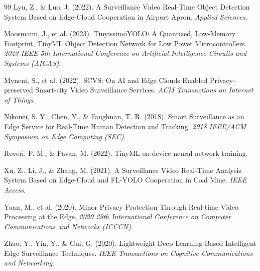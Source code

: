 \documentclass[12pt, a4paper]{article}
\begin{document}
\begin{thebibliography}{99}
 Lyu, Z., \& Luo, J. (2022). A Surveillance Video Real-Time Object Detection System Based on Edge-Cloud Cooperation in Airport Apron. \textit{Applied Sciences}. %

 Moosmann, J., et al. (2023). TinyissimoYOLO: A Quantized, Low-Memory Footprint, TinyML Object Detection Network for Low Power Microcontrollers. \textit{2023 IEEE 5th International Conference on Artificial Intelligence Circuits and Systems (AICAS)}. %

 Myneni, S., et al. (2022). SCVS: On AI and Edge Clouds Enabled Privacy-preserved Smart-city Video Surveillance Services. \textit{ACM Transactions on Internet of Things}. %

 Nikouei, S. Y., Chen, Y., \& Faughnan, T. R. (2018). Smart Surveillance as an Edge Service for Real-Time Human Detection and Tracking. \textit{2018 IEEE/ACM Symposium on Edge Computing (SEC)}. %

 Roveri, P. M., \& Pavan, M. (2022). TinyML on-device neural network training. %

 Xu, Z., Li, J., \& Zhang, M. (2021). A Surveillance Video Real-Time Analysis System Based on Edge-Cloud and FL-YOLO Cooperation in Coal Mine. \textit{IEEE Access}. %

 Yuan, M., et al. (2020). Minor Privacy Protection Through Real-time Video Processing at the Edge. \textit{2020 29th International Conference on Computer Communications and Networks (ICCCN)}. %

 Zhao, Y., Yin, Y., \& Gui, G. (2020). Lightweight Deep Learning Based Intelligent Edge Surveillance Techniques. \textit{IEEE Transactions on Cognitive Communications and Networking}. %

\end{thebibliography}
\end{document}
